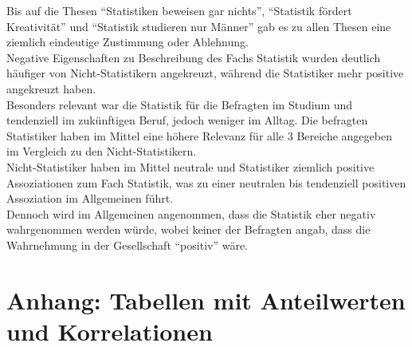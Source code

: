 \documentclass[12pt,a4paper,titlepage=true,parskip,ngerman]{scrartcl}
\begin{document}
{\small Bis auf die Thesen \enquote{Statistiken beweisen gar nichts}, \enquote{Statistik fördert Kreativität} und \enquote{Statistik studieren nur Männer} gab es zu allen Thesen eine ziemlich eindeutige Zustimmung oder Ablehnung.\\
Negative Eigenschaften zu Beschreibung des Fachs Statistik wurden deutlich häufiger von Nicht-Statistikern angekreuzt, während die Statistiker mehr positive angekreuzt haben.\\
Besonders relevant war die Statistik für die Befragten im Studium und tendenziell im zukünftigen Beruf, jedoch weniger im Alltag. Die befragten Statistiker haben im Mittel eine höhere Relevanz für alle 3 Bereiche angegeben im Vergleich zu den Nicht-Statistikern.\\
Nicht-Statistiker haben im Mittel neutrale und Statistiker ziemlich positive Assoziationen zum Fach Statistik, was zu einer neutralen bis tendenziell positiven Assoziation im Allgemeinen führt.\\
Dennoch wird im Allgemeinen angenommen, dass die Statistik eher negativ wahrgenommen werden würde, wobei keiner der Befragten angab, dass die Wahrnehmung in der Gesellschaft \enquote{positiv} wäre.}

\section{Anhang: Tabellen mit Anteilwerten und Korrelationen}
\end{document}
